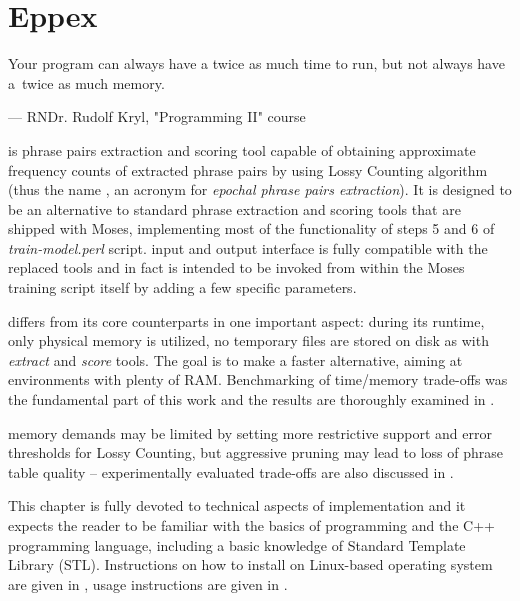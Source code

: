 
\chapter{Eppex}
\label{chap:eppex}

\setlength{\epigraphwidth}{1.0\textwidth}
\epigraph{Your program can always have a twice as much time to run, but not always have a~twice as much memory.}{--- RNDr. Rudolf Kryl, "Programming II" course}

\Eppex{} is phrase pairs extraction and scoring tool capable of obtaining approximate
frequency counts of extracted phrase pairs by using Lossy Counting algorithm
(thus the name \eppex{}, an acronym for \emph{epochal phrase pairs extraction}).
It is designed to be an alternative to standard phrase extraction and scoring tools that
are shipped with Moses, implementing most of the functionality of steps 5 and 6 of
\emph{train-model.perl} script.
\Eppex{} input and output interface is fully compatible with the replaced tools
and \eppex{} in fact is intended to be invoked from within the Moses training script itself
by adding a few specific parameters.

\Eppex{} differs from its core counterparts in one important aspect: during its runtime,
only physical memory is utilized, no temporary files are stored on disk as with \emph{extract}
and \emph{score} tools.
The goal is to make \eppex{} a faster alternative, aiming at environments with plenty of RAM.
Benchmarking of time/memory trade-offs was the fundamental part of this work and the results are
thoroughly examined in .

\Eppex{} memory demands may be limited by setting more restrictive support and error thresholds
for Lossy Counting, but aggressive pruning may lead to loss of phrase table quality --
experimentally evaluated trade-offs are also discussed in .

This chapter is fully devoted to technical aspects of implementation and it expects the reader
to be familiar with the basics of programming and the C++ programming language, including
a basic knowledge of Standard Template Library (STL).
Instructions on how to install \eppex{} on Linux-based operating system are given in
, usage instructions are given in .


